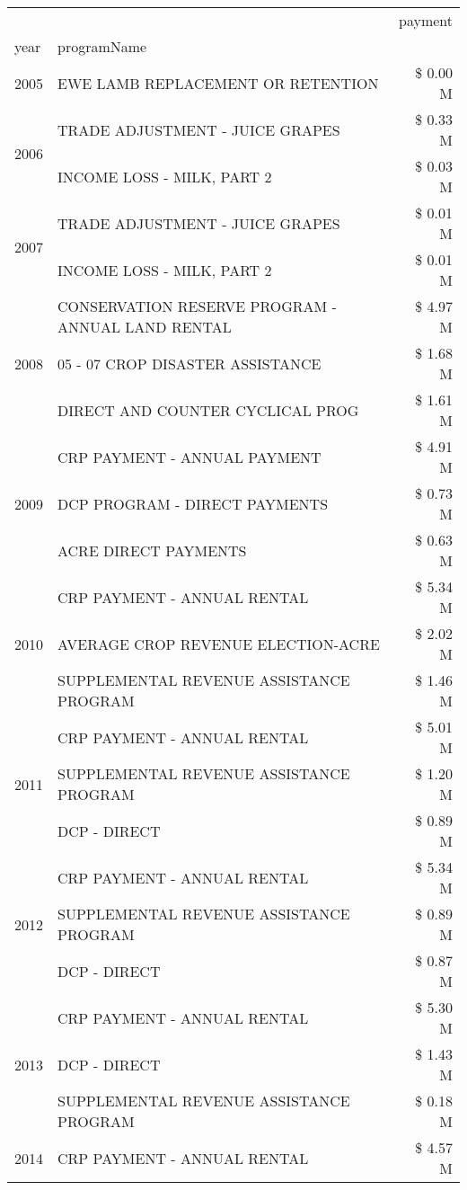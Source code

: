 \begin{tabular}{llr}
\toprule
 &  & payment \\
year & programName &  \\
\midrule
2005 & EWE LAMB REPLACEMENT OR RETENTION & \$ 0.00 M \\
\cline{1-3}
\multirow[t]{2}{*}{2006} & TRADE ADJUSTMENT - JUICE GRAPES & \$ 0.33 M \\
 & INCOME LOSS - MILK, PART 2 & \$ 0.03 M \\
\cline{1-3}
\multirow[t]{2}{*}{2007} & TRADE ADJUSTMENT - JUICE GRAPES & \$ 0.01 M \\
 & INCOME LOSS - MILK, PART 2 & \$ 0.01 M \\
\cline{1-3}
\multirow[t]{3}{*}{2008} & CONSERVATION RESERVE PROGRAM - ANNUAL LAND RENTAL & \$ 4.97 M \\
 & 05 - 07 CROP DISASTER ASSISTANCE & \$ 1.68 M \\
 & DIRECT AND COUNTER CYCLICAL PROG & \$ 1.61 M \\
\cline{1-3}
\multirow[t]{3}{*}{2009} & CRP PAYMENT - ANNUAL PAYMENT & \$ 4.91 M \\
 & DCP PROGRAM - DIRECT PAYMENTS & \$ 0.73 M \\
 & ACRE DIRECT PAYMENTS & \$ 0.63 M \\
\cline{1-3}
\multirow[t]{3}{*}{2010} & CRP PAYMENT - ANNUAL RENTAL & \$ 5.34 M \\
 & AVERAGE CROP REVENUE ELECTION-ACRE & \$ 2.02 M \\
 & SUPPLEMENTAL REVENUE ASSISTANCE PROGRAM & \$ 1.46 M \\
\cline{1-3}
\multirow[t]{3}{*}{2011} & CRP PAYMENT - ANNUAL RENTAL & \$ 5.01 M \\
 & SUPPLEMENTAL REVENUE ASSISTANCE PROGRAM & \$ 1.20 M \\
 & DCP - DIRECT & \$ 0.89 M \\
\cline{1-3}
\multirow[t]{3}{*}{2012} & CRP PAYMENT - ANNUAL RENTAL & \$ 5.34 M \\
 & SUPPLEMENTAL REVENUE ASSISTANCE PROGRAM & \$ 0.89 M \\
 & DCP - DIRECT & \$ 0.87 M \\
\cline{1-3}
\multirow[t]{3}{*}{2013} & CRP PAYMENT - ANNUAL RENTAL & \$ 5.30 M \\
 & DCP - DIRECT & \$ 1.43 M \\
 & SUPPLEMENTAL REVENUE ASSISTANCE PROGRAM & \$ 0.18 M \\
\cline{1-3}
\multirow[t]{3}{*}{2014} & CRP PAYMENT - ANNUAL RENTAL & \$ 4.57 M \\

\end{tabular}
